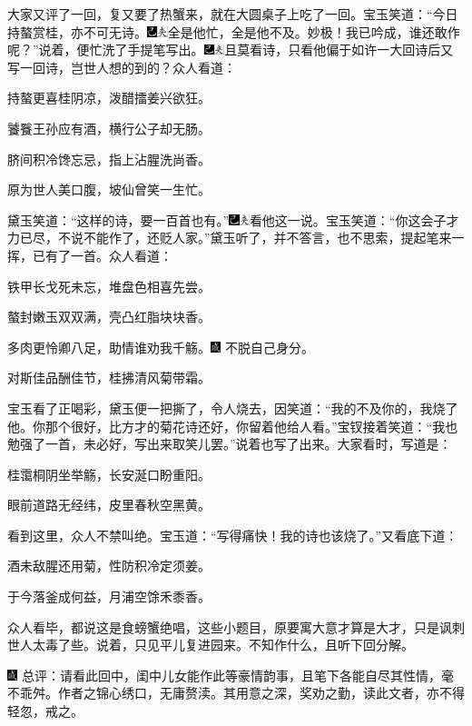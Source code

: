 大家又评了一回，复又要了热蟹来，就在大圆桌子上吃了一回。宝玉笑道：“今日持螯赏桂，亦不可无诗。{\includegraphics[width=3mm]{../Images/00003}\includegraphics[width=3mm]{../Images/00012}\footnotesize \kaishu 全是他忙，全是他不及。妙极！}我已吟成，谁还敢作呢？”说着，便忙洗了手提笔写出。{\includegraphics[width=3mm]{../Images/00003}\includegraphics[width=3mm]{../Images/00012}\footnotesize \kaishu 且莫看诗，只看他偏于如许一大回诗后又写一回诗，岂世人想的到的？}众人看道：

持螯更喜桂阴凉，泼醋擂姜兴欲狂。

饕餮王孙应有酒，横行公子却无肠。

脐间积冷馋忘忌，指上沾腥洗尚香。

原为世人美口腹，坡仙曾笑一生忙。

黛玉笑道：“这样的诗，要一百首也有。”{\includegraphics[width=3mm]{../Images/00003}\includegraphics[width=3mm]{../Images/00012}\footnotesize \kaishu 看他这一说。}宝玉笑道：“你这会子才力已尽，不说不能作了，还贬人家。”黛玉听了，并不答言，也不思索，提起笔来一挥，已有了一首。众人看道：

铁甲长戈死未忘，堆盘色相喜先尝。

螯封嫩玉双双满，壳凸红脂块块香。

多肉更怜卿八足，助情谁劝我千觞。{\includegraphics[width=3mm]{../Images/00005}  \kaishu 不脱自己身分。}

对斯佳品酬佳节，桂拂清风菊带霜。

宝玉看了正喝彩，黛玉便一把撕了，令人烧去，因笑道：“我的不及你的，我烧了他。你那个很好，比方才的菊花诗还好，你留着他给人看。”宝钗接着笑道：“我也勉强了一首，未必好，写出来取笑儿罢。”说着也写了出来。大家看时，写道是：

桂霭桐阴坐举觞，长安涎口盼重阳。

眼前道路无经纬，皮里春秋空黑黄。

看到这里，众人不禁叫绝。宝玉道：“写得痛快！我的诗也该烧了。”又看底下道：

酒未敌腥还用菊，性防积冷定须姜。

于今落釜成何益，月浦空馀禾黍香。

众人看毕，都说这是食螃蟹绝唱，这些小题目，原要寓大意才算是大才，只是讽刺世人太毒了些。说着，只见平儿复进园来。不知作什么，且听下回分解。

{\includegraphics[width=3mm]{../Images/00005}  \kaishu 总评：请看此回中，闺中儿女能作此等豪情韵事，且笔下各能自尽其性情，毫不乖舛。作者之锦心绣口，无庸赘渎。其用意之深，奖劝之勤，读此文者，亦不得轻忽，戒之。}